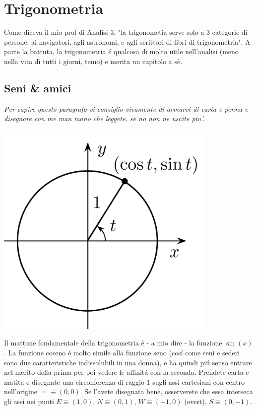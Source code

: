 \chapter{Trigonometria}
\label{trigonometria}
\label{seniecoseni}

Come diceva il mio prof di Analisi 3, "la trigonometia serve solo a 3 categorie di persone: ai navigatori, 
agli astronomi, e agli scrittori di libri di trigonometria".
A parte la battuta, la trigonometria \'e qualcosa di molto utile nell'analisi
(meno nella vita di tutti i giorni, temo) e merita un capitolo a s\`e.

\section{Seni \& amici}

{\em Per capire questo paragrafo vi consiglio vivamente di armarvi di carta e penna e disegnare con me man mano che leggete, se no non ne uscite piu'.}

\includegraphics[height = 300pt, width = 300pt]{images/04trigonometria/circonferenza_goniometrica.png}

Il mattone fondamentale della trigonometria \'e - a mio dire - la funzione $\sin(x)$. La funzione coseno \'e molto simile alla funzione
seno (cos\'i come seni e sederi sono due caratteristiche indissolubili in una donna), e ha quindi pi\'u senso entrare nel merito della
prima per poi vedere le affinit\'a con la seconda. Prendete carta e matita e disegnate una circonferenza di raggio $1$ sugli assi cartesiani
con centro nell'origine $= \equiv (0,0)$. Se l'avete disegnata bene, osserverete che essa interseca gli assi nei punti 
$E \equiv (1,0)$, $N \equiv (0,1)$, $W \equiv (-1,0)$ (ovest), $S \equiv (0,-1)$. 

